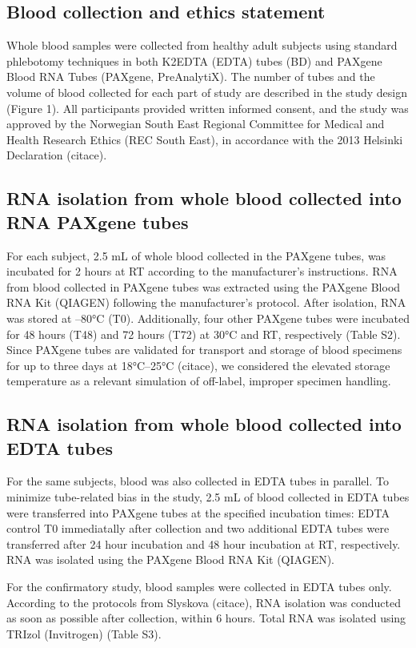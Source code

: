 \documentclass[fleqn,10pt]{wlscirep}
\begin{document}
\subsection*{Blood collection and ethics statement}
Whole blood samples were collected from healthy adult subjects using standard phlebotomy techniques in both K2EDTA (EDTA) tubes (BD) and PAXgene Blood RNA Tubes (PAXgene, PreAnalytiX). The number of tubes and the volume of blood collected for each part of study are described in the study design (Figure 1). All participants provided written informed consent, and the study was approved by the Norwegian South East Regional Committee for Medical and Health Research Ethics (REC South East), in accordance with the 2013 Helsinki Declaration (citace).

\subsection*{RNA isolation from whole blood collected into RNA PAXgene tubes}
For each subject, 2.5 mL of whole blood collected in the PAXgene tubes, was incubated for 2 hours at RT according to the manufacturer's instructions. RNA from blood collected in PAXgene tubes was extracted using the PAXgene Blood RNA Kit (QIAGEN) following the manufacturer's protocol. After isolation, RNA was stored at –80°C (T0). Additionally, four other PAXgene tubes were incubated for 48 hours (T48) and 72 hours (T72) at 30°C and RT, respectively (Table S2). Since PAXgene tubes are validated for transport and storage of blood specimens for up to three days at 18°C–25°C (citace), we considered the elevated storage temperature as a relevant simulation of off-label, improper specimen handling. 

\subsection*{RNA isolation from whole blood collected into EDTA tubes}
For the same subjects, blood was also collected in EDTA tubes in parallel. To minimize tube-related bias in the study, 2.5 mL of blood collected in EDTA tubes were transferred into PAXgene tubes at the specified incubation times: EDTA control T0 immediatally after collection and two additional EDTA tubes were transferred after 24 hour incubation and 48 hour incubation at RT, respectively. RNA was isolated using the PAXgene Blood RNA Kit (QIAGEN).

For the confirmatory study, blood samples were collected in EDTA tubes only. According to the protocols from Slyskova (citace), RNA isolation was conducted as soon as possible after collection, within 6 hours. Total RNA was isolated using TRIzol (Invitrogen) (Table S3).  
\end{document}
